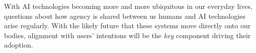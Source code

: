 With AI technologies becoming more and more ubiquitous in our everyday lives, questions about how agency is shared between us humans and AI technologies arise regularly. With the likely future that these systems move directly onto our bodies, alignment with users' intentions will be the \textit{key} component driving their adoption.





\begin{comment}
- relevance of research for prostheses ( see https://link.springer.com/chapter/10.1007/978-3-030-38740-2_8)
- EMS augmented interaction might make sense for bigger movements (e,g. back muscle to support lifting) -> might have less effect (negative) effect on the feeling of control, since it is a less specific movement
- However, brain signal might not be the best indicator in such cases (simply motion tracking indicating the start of the movement)


\missingfigure[]{Hand weg zieh spiel foto, beispielhafte playful experience in der es interessant ist mit dem agency konzept herumzuspielen und es spielerisch zu entdecken?}

- a bit on HCINT?



\end{comment}